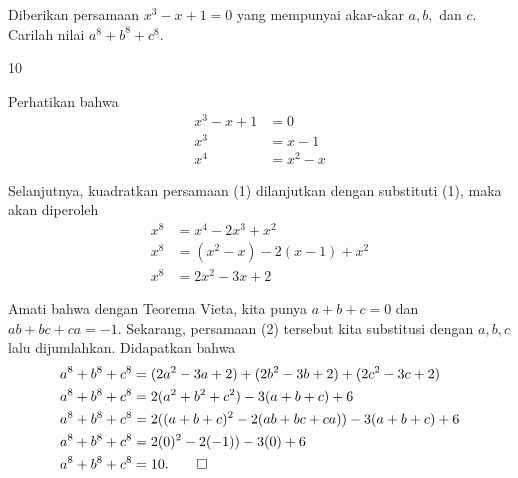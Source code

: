 \documentclass[12pt]{scrartcl}
\begin{document}
	\begin{soalbaru}
		Diberikan persamaan $x^3-x+1=0$ yang mempunyai akar-akar $a,b,$ dan $c$. Carilah nilai $a^8+b^8+c^8$.
		\begin{jawaban}
		10
		\end{jawaban}
		\begin{solusi}
		Perhatikan bahwa \begin{equation}
		\begin{split}
		x^3 - x +1&=0\\
		x^3 &= x-1\\
		x^4 &= x^2 -x
		\end{split}
		\end{equation}
		
		Selanjutnya, kuadratkan persamaan (1) dilanjutkan dengan substituti (1), maka akan diperoleh
		\begin{equation}
		\begin{split}
		x^8 &= x^4 -2x^3 +x^2\\
		x^8 &= (x^2-x)-2(x-1)+x^2\\
		x^8 &= 2x^2-3x+2
		\end{split}
		\end{equation}
		
		Amati bahwa dengan Teorema Vieta, kita punya $a+b+c=0$ dan $ab+bc+ca=-1$. Sekarang, persamaan (2) tersebut kita substitusi dengan $a,b,c$ lalu dijumlahkan. Didapatkan bahwa
		\begin{equation*}
		\begin{split}
		a^8+b^8+c^8&=(2a^2-3a+2)+(2b^2-3b+2)+(2c^2-3c+2)\\
		a^8+b^8+c^8&=2(a^2+b^2+c^2)-3(a+b+c)+6\\
		a^8+b^8+c^8&=2((a+b+c)^2-2(ab+bc+ca))-3(a+b+c)+6\\
		a^8+b^8+c^8&=2(0)^2-2(-1))-3(0)+6\\
		a^8+b^8+c^8&=10. \qed
		\end{split}
		\end{equation*}
		\end{solusi}
	\end{soalbaru}
	
\end{document}

